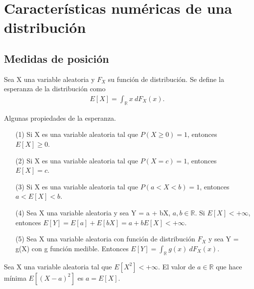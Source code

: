 \chapter{Características numéricas de una distribución}

\section{Medidas de posición}

\begin{defi}[Esperanza]
    Sea X una variable aleatoria y $F_X$ su función de distribución. Se define la esperanza de la distribución como
    \begin{align*}
        E[X] = \int_{\mathbb{R}}{x \ dF_X(x)}.
    \end{align*}
\end{defi}

\begin{prop}
    Algunas propiedades de la esperanza.
    \begin{enumerate}
        \item[(1)] Si X es una variable aleatoria tal que $P(X \ge 0) = 1$, entonces $E[X] \ge 0$.
        \item[(2)] Si X es una variable aleatoria tal que $P(X = c) = 1$, entonces $E[X] = c$.
        \item[(3)] Si X es una variable aleatoria tal que $P(a < X < b) = 1$, entonces $a < E[X] < b$.
        \item[(4)] Sea X una variable aleatoria y sea Y = a + bX, $a, b \in \mathbb{R}$. Si $E[X] < +\infty$, entonces $E[Y] = E[a] + E[bX] = a + bE[X] < +\infty$.
        \item[(5)] Sea X una variable aleatoria con función de distribución $F_X$ y sea Y = g(X) con g función medible. Entonces $E[Y] = \int_{\mathbb{R}}{g(x) \ dF_X(x)}$.
    \end{enumerate}
\end{prop}

\begin{teo}
    Sea X una variable aleatoria tal que $E[X^2] < +\infty$. El valor de $a \in \mathbb{R}$ que hace mínima $E[(X - a)^2]$ es $a = E[X]$.
\end{teo}

